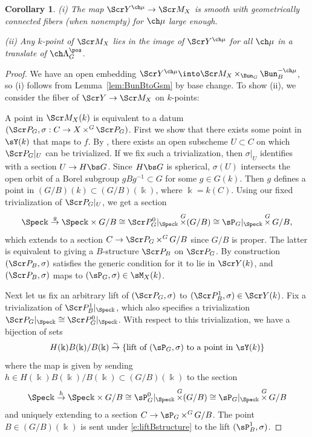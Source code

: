 \documentclass[final]{amsart}
\newtheorem{cor}[subsubsection]{Corollary}
\theoremstyle{remark}
\theoremstyle{definition}
\DeclareMathOperator*{\xt}{\times}
\numberwithin{equation}{section}
\begin{document}
\begin{cor}\label{cor:Mcover}
(i) The map $\Scr Y^{\ch\mu} \to \Scr M_{X}$
is smooth with geometrically connected fibers (when nonempty) for $\ch\mu$ large enough.

(ii)
Any $k$-point of $\Scr M_{X}$ lies in the image of $\Scr Y^{\ch\mu}$ for all $\ch\mu$ in a translate of $\ch\Lambda^\pos_G$. 
\end{cor}
\begin{proof}
We have an open embedding $\Scr Y^{\ch\mu} \into \Scr M_{X} \xt_{\Bun_G} \Bun_B^{-\ch\mu}$, so (i) follows from Lemma~\ref{lem:BunBtoGsm} 
by base change. To show (ii), we consider the fiber of 
$\Scr Y \to \Scr M_{X}$ on $k$-points:

A point in $\Scr M_X(k)$ is equivalent to a datum 
$(\Scr P_G, \sigma : C\to X\xt^G \Scr P_G)$. 
First we show that there exists some point in $\sY(k)$ that maps to $f$. 
By \cite{Steinberg}, there exists an open subscheme $U\subset C$
on which $\Scr P_G|_U$ can be trivialized. 
If we fix such a trivialization, then $\sigma|_U$ 
identifies with a section $U \to H\bs G$. Since $H\bs G$ is
spherical, $\sigma(U)$ intersects the open orbit of a 
Borel subgroup $g B g^{-1} \subset G$ for some $g\in G(k)$. 
Then $g$ defines a point in  
$(G/B)(k) \subset (G/B)(\Bbbk)$, where $\Bbbk=k(C)$. 
Using our fixed trivialization
of $\Scr P_G|_U$, we get a section 
\[ \Spec \Bbbk \overset{g}\to \Spec \Bbbk \times G/B \cong \Scr P_G^0|_{\Spec \Bbbk} \xt^G (G/B) 
\cong \sP_G|_{\Spec \Bbbk} \xt^G G/B, 
\]
which extends to a section $C \to \Scr P_G \xt^G G/B$ since 
$G/B$ is proper. The latter is equivalent to giving a 
$B$-structure $\Scr P_B$ on $\Scr P_G$. 
By construction $(\Scr P_B,\sigma)$ satisfies the generic condition 
for it to lie in $\Scr Y(k)$, and $(\Scr P_B,\sigma)$ maps to $(\sP_G,\sigma) \in \sM_X(k)$. 

Next let us fix an arbitrary lift of $(\Scr P_G,\sigma)$ to $(\Scr P_B^1,\sigma)\in \Scr Y(k)$.
Fix a trivialization of $\Scr P_B^1|_{\Spec \Bbbk}$, which also specifies a 
trivialization $\Scr P_G|_{\Spec \Bbbk} \cong \Scr P_G^0|_{\Spec \Bbbk}$.
With respect to this trivialization, we have a bijection of sets
\begin{equation}\label{e:liftBstructure}
    H(\Bbbk)B(\Bbbk)/B(\Bbbk) \overset\sim\to \{\text{lift of } (\sP_G,\sigma) \text{ to a point in } \sY(k) \} 
\end{equation}
where the map is given by sending $h \in H(\Bbbk)B(\Bbbk)/B(\Bbbk)\subset (G/B)(\Bbbk)$ to 
the section
\[ \Spec \Bbbk \overset{h}\to \Spec \Bbbk \times G/B \cong \sP^0_G|_{\Spec \Bbbk} \xt^G(G/B)
\cong \sP_G|_{\Spec \Bbbk} \xt^G G/B \]
and uniquely extending to a section $C \to \sP_G \xt^G G/B$.
The point $B \in (G/B)(\Bbbk)$ is sent under \eqref{e:liftBstructure} to the lift $(\sP_B^1,\sigma)$.


\end{proof}
\end{document}
